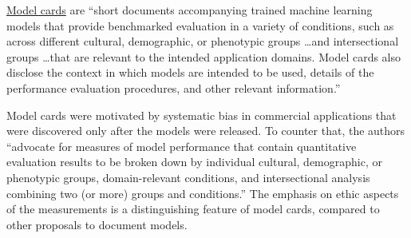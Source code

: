 \documentclass{article}
\begin{document}
\href{https://arxiv.org/abs/1810.03993}{Model cards} are ``short documents accompanying trained machine learning models that provide benchmarked evaluation in a variety of conditions, such as across different cultural, demographic, or phenotypic groups \ldots and intersectional groups \ldots that are relevant to the intended application domains. Model cards also disclose the context in which models are intended to be used, details of the performance evaluation procedures, and other relevant information.''

Model cards were motivated by systematic bias in commercial applications that were discovered only after the models were released. To counter that, the authors ``advocate for measures of model performance that contain quantitative evaluation results to be broken down by individual cultural, demographic, or phenotypic groups, domain-relevant conditions, and intersectional analysis combining two (or more) groups and conditions.'' The emphasis on ethic aspects of the measurements is a distinguishing feature of model cards, compared to other proposals to document models.




\end{document}
